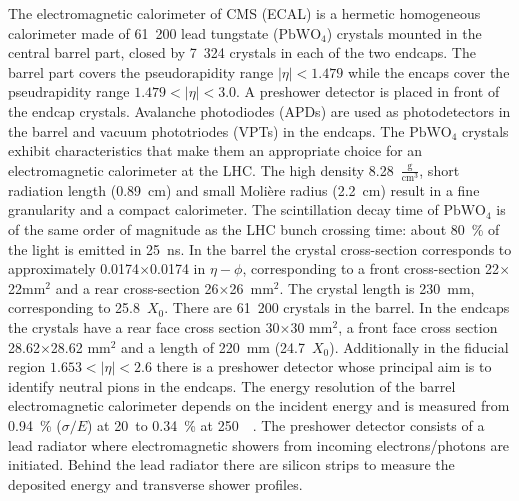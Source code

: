 The electromagnetic calorimeter of CMS (ECAL) is a hermetic homogeneous calorimeter made of 61~200 lead tungstate ($\text{PbWO}_{4}$) crystals mounted in the central barrel part, closed by 7~324 crystals in each of the two endcaps. The barrel part covers the pseudorapidity range $\left|\eta\right|<1.479$ while the encaps cover the pseudrapidity range $1.479<\left|\eta\right|<3.0$. A preshower detector is placed in front of the endcap crystals. Avalanche photodiodes (APDs) are used as photodetectors in the barrel and vacuum phototriodes (VPTs) in the endcaps. The $\text{PbWO}_{4}$ crystals exhibit characteristics that make them an appropriate choice for an electromagnetic calorimeter at the LHC. The high density 8.28~$\frac{\text{g}}{\text{cm}^3}$, short radiation length (0.89~cm) and small Molière radius (2.2~cm) result in a fine granularity and a compact calorimeter. The scintillation decay time of $\text{PbWO}_{4}$ is of the same order of magnitude as the LHC bunch crossing time: about 80~\% of the light is emitted in 25~ns. In the barrel the crystal cross-section corresponds to approximately 0.0174$\times$0.0174 in $\eta-\phi$, corresponding to a front cross-section 22$\times$22$\text{mm}^2$ and a rear cross-section 26$\times$26~$\text{mm}^2$. The crystal length is 230~mm, corresponding to 25.8~$X_{0}$. There are 61~200 crystals in the barrel. In the endcaps the crystals have a rear face cross section 30$\times$30 $\text{mm}^2$, a front face cross section 28.62$\times$28.62 $\text{mm}^2$ and a length of 220~mm (24.7~$X_{0}$). Additionally in the fiducial region $1.653<\left|\eta\right|<2.6$ there is a preshower detector whose principal aim is to identify neutral pions in the endcaps. The energy resolution of the barrel electromagnetic calorimeter depends on the incident energy and is measured from 0.94~\% ($\sigma/E$) at 20~\GeV to 0.34~\% at 250~\GeV~\cite{Adzic:2007mi}. The preshower detector consists of a lead radiator where electromagnetic showers from incoming electrons/photons are initiated. Behind the lead radiator there are silicon strips to measure the deposited energy and transverse shower profiles.

